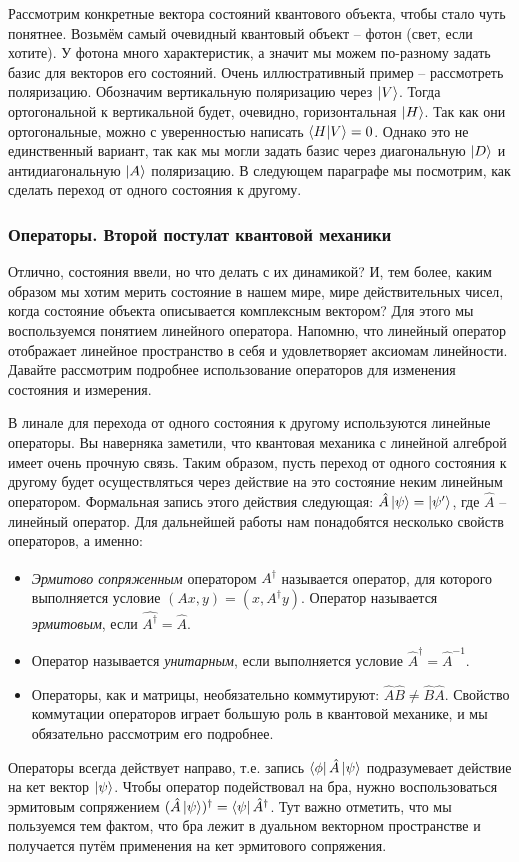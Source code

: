 Рассмотрим конкретные вектора состояний квантового объекта, чтобы стало чуть понятнее. Возьмём самый очевидный квантовый объект -- фотон (свет, если хотите). У фотона много характеристик, а значит мы можем по-разному задать базис для векторов его состояний. Очень иллюстративный пример -- рассмотреть поляризацию. Обозначим вертикальную поляризацию через $\ket{V}$. Тогда ортогональной к вертикальной будет, очевидно, горизонтальная $\ket{H}$. Так как они ортогональные, можно с уверенностью написать $\bra{H}\ket{V} = 0$. Однако это не единственный вариант, так как мы могли задать базис через диагональную $\ket{D}$ и антидиагональную $\ket{A}$ поляризацию. В следующем параграфе мы посмотрим, как сделать переход от одного состояния к другому.

\subsubsection*{Операторы. Второй постулат квантовой механики}

\hspace{1em} Отлично, состояния ввели, но что делать с их динамикой? И, тем более, каким образом мы хотим мерить состояние в нашем мире, мире действительных чисел, когда состояние объекта описывается комплексным вектором? Для этого мы воспользуемся понятием линейного оператора. Напомню, что линейный оператор отображает линейное пространство в себя и удовлетворяет аксиомам линейности. Давайте рассмотрим подробнее использование операторов для изменения состояния и измерения.

В линале для перехода от одного состояния к другому используются линейные операторы. Вы наверняка заметили, что квантовая механика с линейной алгеброй имеет очень прочную связь. Таким образом, пусть переход от одного состояния к другому будет осуществляться через действие на это состояние неким линейным оператором. Формальная запись этого действия следующая: $\hat{A}\ket{\psi} = \ket{\psi'}$, где $\hat{A}$ -- линейный оператор. Для дальнейшей работы нам понадобятся несколько свойств операторов, а именно:
\begin{itemize}
    \item \textit{Эрмитово сопряженным} оператором $\hat{A^{\dagger}}$ называется оператор, для которого выполняется условие $(Ax, y) = (x, A^{\dagger}y)$. Оператор называется \textit{эрмитовым}, если $\hat{A^{\dagger}} = \hat{A}$.
    \item Оператор называется \textit{унитарным}, если выполняется условие $\hat{A}^{\dagger} = \hat{A}^{-1}$.
    \item Операторы, как и матрицы, необязательно коммутируют: $\hat{A}\hat{B} \neq \hat{B}\hat{A}$. Свойство коммутации операторов играет большую роль в квантовой механике, и мы обязательно рассмотрим его подробнее.
\end{itemize}
Операторы всегда действует направо, т.е. запись $\bra{\phi}\hat{A}\ket{\psi}$ подразумевает действие на кет вектор $\ket{\psi}$. Чтобы оператор подействовал на бра, нужно воспользоваться эрмитовым сопряжением $(\hat{A}\ket{\psi})^{\dagger} = \bra{\psi}\hat{A}^{\dagger}$. Тут важно отметить, что мы пользуемся тем фактом, что бра лежит в дуальном векторном пространстве и получается путём применения на кет эрмитового сопряжения.

